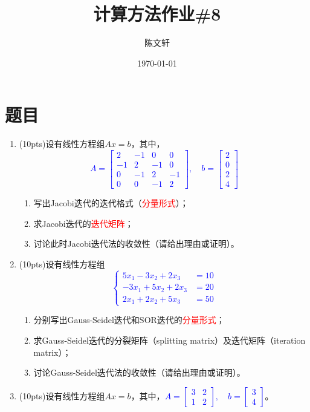 \documentclass[cn,hazy,green,11pt,normal]{elegantnote}
\title{计算方法作业\#8}
\author{陈文轩}
\institute{KFRC}
\date{\today}
\begin{document}
\maketitle

\section{题目}


    \begin{enumerate}
        
        \item (10pts)设有线性方程组$Ax=b$，其中，\textcolor{blue}{\[A=\begin{bmatrix}2&-1&0&0\\-1&2&-1&0\\0&-1&2&-1\\0&0&-1& 2\end{bmatrix},\quad b=\begin{bmatrix}2\\0\\2\\4\end{bmatrix}\]}
            \begin{enumerate}
                \item 写出Jacobi迭代的迭代格式（\textcolor{red}{分量形式}）；
                \item 求Jacobi迭代的\textcolor{red}{迭代矩阵}；
                \item 讨论此时Jacobi迭代法的收敛性（请给出理由或证明）。
            \end{enumerate}

        \item (10pts)设有线性方程组\textcolor{blue}{\[\begin{cases}5x_1-3x_2+2x_3&=10\\-3x_1+5x_2+2x_3&=20\\2x_1+2x_2+5x_3&=50\end{cases}\]}
            \begin{enumerate}
                \item 分别写出Gauss-Seidel迭代和SOR迭代的\textcolor{red}{分量形式}；
                \item 求Gauss-Seidel迭代的分裂矩阵（splitting matrix）及迭代矩阵（iteration matrix）；
                \item 讨论Gauss-Seidel迭代法的收敛性（请给出理由或证明）。
            \end{enumerate}

        \item (10pts)设有线性方程组$Ax=b$，其中，\textcolor{blue}{$A=\begin{bmatrix}3&2\\1&2\end{bmatrix},\quad b=\begin{bmatrix}3\\4\end{bmatrix}$}。


\end{enumerate}
\end{document}
